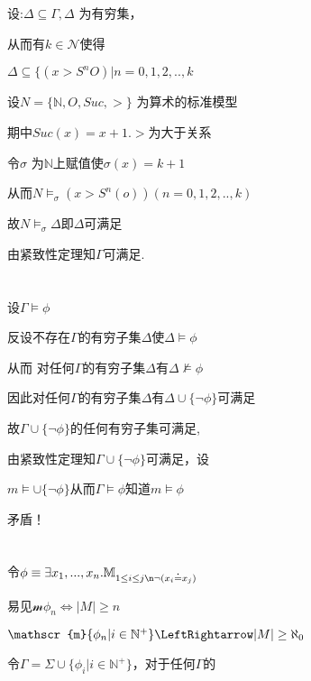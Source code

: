 \documentclass{article}
\begin{document}
\begin{CJK*}{UTF8}{gbsn}

\section{}

设:$\Delta \subseteq \Gamma, \Delta$ 为有穷集，

从而有$k \in \mathcal{N} $使得

$\Delta \subseteq \{ (x > S^nO) | n=0,1,2,..,k$

设$N = \{ \mathbb{N},O,Suc , >  \}$ 为算术的标准模型

期中$ Suc (x) =x+1 . >$为大于关系

令$\sigma$ 为$\mathbb{N}$上赋值使$\sigma (x) = k+1$

从而$N \vDash_\sigma (x>S^n(o))(n=0,1,2,..,k)$

故$N \vDash_\sigma \Delta$即$\Delta$可满足

由紧致性定理知$\Gamma$可满足.

\section{}


设$\Gamma \vDash \phi$

反设不存在$\Gamma$的有穷子集$\Delta$使$\Delta \vDash \phi$

从而 对任何$\Gamma$的有穷子集$\Delta$有$\Delta \nvDash \phi$

因此对任何$\Gamma$的有穷子集$\Delta$有$\Delta \cup \{\neg \phi\}$可满足

故$\Gamma \cup \{\neg \phi\}$的任何有穷子集可满足,

由紧致性定理知$\Gamma \cup \{\neg \phi\}$可满足，设

$m \vDash \cup\{\neg \phi\}$从而$\Gamma \vDash \phi$知道$m \vDash \phi$

矛盾！

\section{}

令$\phi \equiv \exists x_1,...,x_n. \mathbb{M}_{1\leq i\leq j\n \neg (x_i \doteq x_j)}$

易见$\mathscr{m} \phi_n \Longleftrightarrow |M|\geq n$

$\mathscr{m}\{ \phi_n | i\in \mathbb{N}^+ \} \LeftRightarrow |M|\geq \aleph_0$

令$\Gamma =\Sigma \cup \{ \phi_i | i \in \mathbb{N}^+ \}$，对于任何$\Gamma$的


\end{CJK*}
\end{document}

